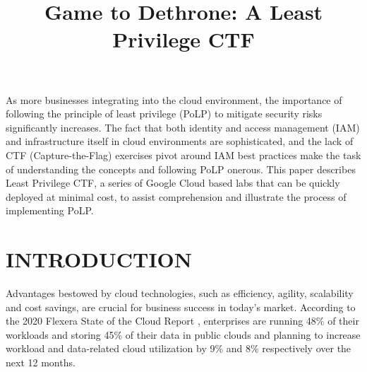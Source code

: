 \documentclass[a4paper,twoside]{article}
\begin{document}
\title{Game to Dethrone: A Least Privilege CTF}


\author{
}

\abstract
{As more businesses integrating into the cloud environment, the importance of following the principle of least privilege (PoLP) to mitigate security risks significantly increases. The fact that both identity and access management (IAM) and infrastructure itself in cloud environments are sophisticated, and the lack of CTF (Capture-the-Flag) exercises pivot around IAM best practices make the task of understanding the concepts and following PoLP onerous. This paper describes Least Privilege CTF, a series of Google Cloud based labs that can be quickly deployed at minimal cost, to assist comprehension and illustrate the process of implementing PoLP.
}

\onecolumn \maketitle \normalsize \setcounter{footnote}{0} \vfill

\section{\uppercase{Introduction}}
\label{sec:introduction}

\noindent Advantages bestowed by cloud technologies, such as efficiency, agility, scalability and cost savings, are crucial for business success in today’s market. According to the 2020 Flexera State of the Cloud Report \cite{Flexera2020}, enterprises are running 48\% of their workloads and storing 45\% of their data in public clouds and planning to increase workload and data-related cloud utilization by 9\% and 8\% respectively over the next 12 months. 
\end{document}
